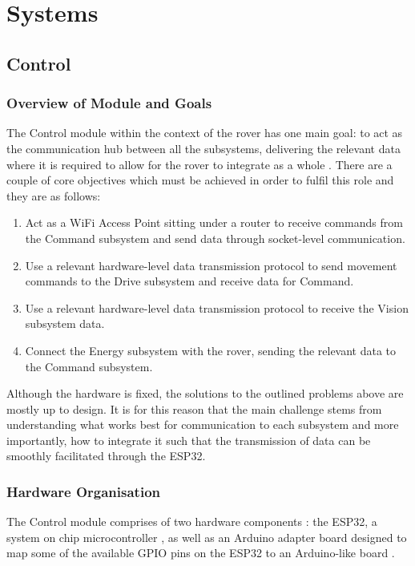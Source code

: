 \documentclass[a4paper]{article}
\begin{document}
\section{Systems}

\subsection{Control}
 
\subsubsection{Overview of Module and Goals}
The Control module within the context of the rover has one main goal: 
to act as the communication hub between all the subsystems, delivering
the relevant data where it is required to allow for the rover to integrate
as a whole \cite{MarsRoverSpec}. There are a couple of core objectives which must be 
achieved in order to fulfil this role and they are as follows:

\begin{enumerate}
    \item Act as a WiFi Access Point sitting under a router to receive
    commands from the Command subsystem and send data through socket-level communication.
    \item Use a relevant hardware-level data transmission protocol to
    send movement commands to the Drive subsystem and receive data for Command. 
    \item Use a relevant hardware-level data transmission protocol to receive
    the Vision subsystem data.
    \item Connect the Energy subsystem with the rover, sending the relevant data
    to the Command subsystem.
\end{enumerate}

Although the hardware is fixed, the solutions to the outlined problems
above are mostly up to design. It is for this reason that the main challenge
stems from understanding what works best for communication to each subsystem
and more importantly, how to integrate it such that the transmission of data
can be smoothly facilitated through the ESP32.

\subsubsection{Hardware Organisation}

The Control module comprises of two hardware components \cite{BoxContent}: 
the ESP32, a system on chip microcontroller \cite{ESP32Datasheet}, as well as an Arduino adapter
board designed to map some of the available GPIO pins on the ESP32 to an Arduino-like
board \cite{ESP32ArduinoAdapter}.
\end{document}
